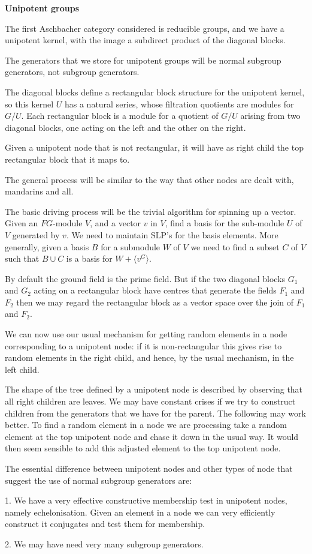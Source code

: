 
\centerline{\bf Unipotent groups}
\medskip
The first Aschbacher category considered is reducible groups, and we have a unipotent kernel,
with the image a subdirect product of the diagonal blocks.

The generators that we store for unipotent groups will be normal subgroup generators, not subgroup generators.

The diagonal blocks define a rectangular block structure for the unipotent kernel, so this kernel  $U$ has a 
natural series, whose filtration quotients are modules for $G/U$.  Each rectangular block is a module for
a quotient of $G/U$ arising from two diagonal blocks, one acting on the left and the other on the right.

Given a unipotent node that is not rectangular, it will have as right child the top rectangular
block that it maps to.

The general process will be similar to the way that other nodes are dealt with, mandarins and all.

The basic driving process will be the trivial algorithm for spinning up a vector.  Given an $FG$-module
 $V$, and a vector $v$ in $V$, find a basis for the sub-module $U$ of $V$ generated by $v$.  We need to
 maintain SLP's for the basis elements.  More generally, given a basis $B$ for a submodule $W$ of
 $V$ we need to find a subset $C$ of $V$ such that $B\cup C$ is a basis for $W+\langle v^G\rangle$.
 
 By default the ground field is the prime field.  But if the two diagonal blocks $G_1$ and $G_2$
 acting on a rectangular block
 have centres that generate the fields $F_1$ and $F_2$ then we may regard the rectangular block
 as a vector space over the join of $F_1$ and $F_2$.
 
 We can now use our usual mechanism for getting random elements in a node corresponding to
 a unipotent node: if it is non-rectangular this gives rise to random elements in the right child,
 and hence, by the usual mechanism, in the left child.
 
 The shape of the tree defined by a unipotent node is described by observing that all right
 children are leaves.  We may have constant crises if we try to construct children from the
 generators that we have for the parent.  The following may work better.  To find a random element
 in a node we are processing take a random element at the top unipotent node and chase it down in the usual way.  It would then seem sensible to add this adjusted element to the top unipotent node.
 
 The essential difference between unipotent nodes and other types of node that suggest the use
 of normal subgroup generators are:
 
 1.  We have a very effective constructive membership test in unipotent nodes, namely echelonisation.
 Given an element in a node we can very efficiently construct it conjugates and test them for
 membership.
 
 2.  We may have need very many subgroup generators.
 
 \bye
